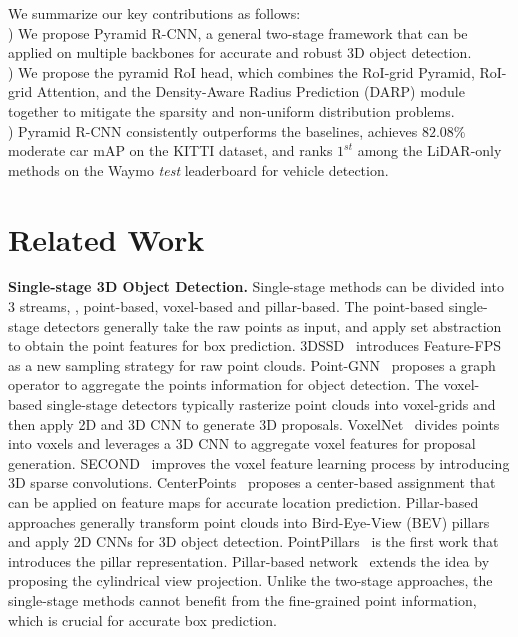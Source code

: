 \documentclass[10pt,twocolumn,letterpaper]{article}
\begin{document}
We summarize our key contributions as follows: \\
) We propose Pyramid R-CNN, a general two-stage framework that can be applied on multiple backbones for accurate and robust 3D object detection.\\
) We propose the pyramid RoI head, which combines the RoI-grid Pyramid, RoI-grid Attention, and the Density-Aware Radius Prediction (DARP) module together to mitigate the sparsity and non-uniform distribution problems.\\ 
) Pyramid R-CNN consistently outperforms the baselines, achieves $82.08\%$ moderate car mAP on the KITTI dataset, and ranks $1^{st}$ among the LiDAR-only methods on the Waymo \textit{test} leaderboard for vehicle detection.

\section{Related Work}

\noindent\textbf{Single-stage 3D Object Detection.} Single-stage methods can be divided into $3$ streams, \ie, point-based, voxel-based and pillar-based. The point-based single-stage detectors generally take the raw points as input, and apply set abstraction~\cite{qi2017pointnet++, mao2019interpolated} to obtain the point features for box prediction. 3DSSD~\cite{yang20203dssd} introduces Feature-FPS as a new sampling strategy for raw point clouds. Point-GNN~\cite{pointgnn} proposes a graph operator to aggregate the points information for object detection. The voxel-based single-stage detectors typically rasterize point clouds into voxel-grids and then apply 2D and 3D CNN to generate 3D proposals. VoxelNet~\cite{zhou2018voxelnet} divides points into voxels and leverages a 3D CNN to aggregate voxel features for proposal generation. SECOND~\cite{yan2018second} improves the voxel feature learning process by introducing 3D sparse convolutions. CenterPoints~\cite{yin2020center} proposes a center-based assignment that can be applied on feature maps for accurate location prediction. Pillar-based approaches generally transform point clouds into Bird-Eye-View (BEV) pillars and apply 2D CNNs for 3D object detection. PointPillars~\cite{lang2019pointpillars} is the first work that introduces the pillar representation. Pillar-based network~\cite{wang2020pillar} extends the idea by proposing the cylindrical view projection. Unlike the two-stage approaches, the single-stage methods cannot benefit from the fine-grained point information, which is crucial for accurate box prediction.
\end{document}
